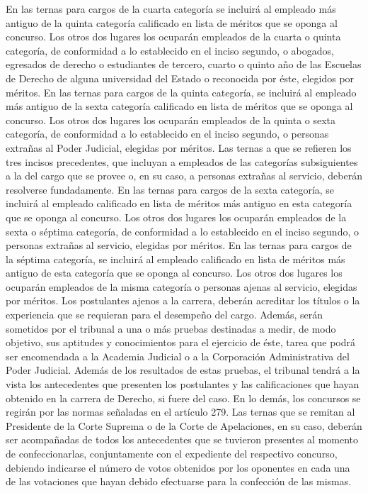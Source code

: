     En las ternas para cargos de la cuarta categoría se incluirá al empleado más antiguo de la quinta categoría calificado en lista de méritos que se oponga al concurso. Los otros dos lugares los ocuparán empleados de la cuarta o quinta categoría, de conformidad a lo establecido en el inciso segundo, o abogados, egresados de derecho o estudiantes de tercero, cuarto o quinto año de las Escuelas de Derecho de alguna universidad del Estado o reconocida por éste, elegidos por méritos.
    En las ternas para cargos de la quinta categoría, se incluirá al empleado más antiguo de la sexta categoría calificado en lista de méritos que se oponga al concurso. Los otros dos lugares los ocuparán empleados de la quinta o sexta categoría, de conformidad a lo establecido en el inciso segundo, o personas extrañas al Poder Judicial, elegidas por méritos.
    Las ternas a que se refieren los tres incisos precedentes, que incluyan a empleados de las categorías subsiguientes a la del cargo que se provee o, en su caso, a personas extrañas al servicio, deberán resolverse fundadamente.
    En las ternas para cargos de la sexta categoría, se incluirá al empleado calificado en lista de méritos más antiguo en esta categoría que se oponga al concurso. Los otros dos lugares los ocuparán empleados de la sexta o séptima categoría, de conformidad a lo establecido en el inciso segundo, o personas extrañas al servicio, elegidas por méritos.
    En las ternas para cargos de la séptima categoría, se incluirá al empleado calificado en lista de méritos más antiguo de esta categoría que se oponga al concurso. Los otros dos lugares los ocuparán empleados de la misma categoría o personas ajenas al servicio, elegidas por méritos.
    Los postulantes ajenos a la carrera, deberán acreditar los títulos o la experiencia que se requieran para el desempeño del cargo. Además, serán sometidos por el tribunal a una o más pruebas destinadas a medir, de modo objetivo, sus aptitudes y conocimientos para el ejercicio de éste, tarea que podrá ser encomendada a la Academia Judicial o a la Corporación Administrativa del Poder Judicial. Además de los resultados de estas pruebas, el tribunal tendrá a la vista los antecedentes que presenten los postulantes y las calificaciones que hayan obtenido en la carrera de Derecho, si fuere del caso.
    En lo demás, los concursos se regirán por las normas señaladas en el artículo 279.
    Las ternas que se remitan al Presidente de la Corte Suprema o de la Corte de Apelaciones, en su caso, deberán ser acompañadas de todos los antecedentes que se tuvieron presentes al momento de confeccionarlas, conjuntamente con el expediente del respectivo concurso, debiendo indicarse el número de votos obtenidos por los oponentes en cada una de las votaciones que hayan debido efectuarse para la confección de las mismas.
